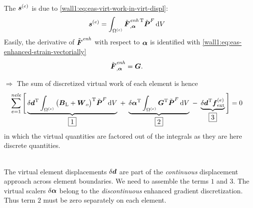\\
The  $\boldsymbol{s}^{(e)}$ is due to
\eqref{wall1:eq:eas-virt-work-in-virt-displ}:
\begin{equation}\label{wall1:eq:eas-constraint-vector}
  \boldsymbol{s}^{(e)}
  = \int_{\Omega^{(e)}} \tilde{\boldsymbol{F}}_{,\boldsymbol{\alpha}}^{\mathit{enh}\,\mathrm{T}} \tilde{\boldsymbol{P}}^{F}
  \, \mathrm{d} V
\end{equation}
Easily, the derivative of $\tilde{\boldsymbol{F}}^{\mathit{enh}}$ with respect to $\boldsymbol{\alpha}$
is identified with \eqref{wall1:eq:eas-enhanced-strain-vectorially}
\begin{equation}
    \tilde{\boldsymbol{F}}_{,\boldsymbol{\alpha}}^{\mathit{enh}}
  = \boldsymbol{G}
  \text{.}
\end{equation}


$\Longrightarrow$ The sum of discretized virtual work of each element is
hence\\
\begin{equation}
  \sum_{e=1}^{\mathit{nele}} \Bigg[
  \underbrace{\delta\boldsymbol{d}^{\mathrm{T}} \int_{\Omega^{(e)}} 
    \big(\boldsymbol{B}_{\text{L}} + \boldsymbol{W}_o \big)^{\mathrm{T}} \tilde{\boldsymbol{P}}^F
  \,\mathrm{d} V}_{\boxed{1}}
  \;+\; \underbrace{\delta\boldsymbol{\alpha}^{\mathrm{T}} \int_{\Omega^{(e)}} 
    \boldsymbol{G}^{\mathrm{T}} \tilde{\boldsymbol{P}}^F
  \,\mathrm{d} V}_{\boxed{2}}
  \;-\; \underbrace{\delta\boldsymbol{d}^{\mathrm{T}} \boldsymbol{f}_{\text{ext}}^{(e)}}_{\boxed{3}}
  \Bigg]
  = 0
\end{equation}
in which the virtual quantities are factored out of the integrals as they are
here discrete quantities.

\\
The virtual element displacements $\delta\boldsymbol{d}$ are part of the
\emph{continuous} displacement approach across element boundaries. We need to
assemble the terms $\boxed{1}$ and $\boxed{3}$. The virtual  scalers
$\delta\boldsymbol{\alpha}$ belong to the \emph{discontinuous} enhanced 
gradient discretization. Thus term $\boxed{2}$ must be zero
separately  on each element.

